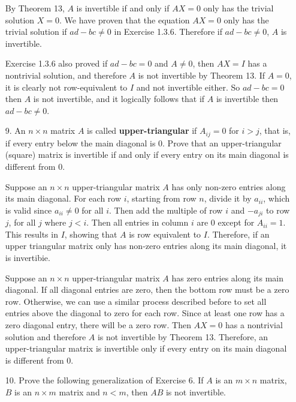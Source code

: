 \documentclass{article}
\begin{document}
\begin{enumerate}[listparindent=\parindent]
By Theorem 13, \(A\) is invertible if and only if \(AX = 0\) only has the trivial solution \(X = 0\).
We have proven that the equation \(AX = 0\) only has the trivial solution if \(ad - bc \neq 0\) in Exercise 1.3.6.
Therefore if \(ad - bc \neq 0\), \(A\) is invertible.

Exercise 1.3.6 also proved if \(ad - bc = 0\) and \(A \neq 0\), then \(AX = I\) has a nontrivial solution,
and therefore \(A\) is not invertible by Theorem 13. If \(A = 0\), it is clearly not row-equivalent to \(I\) and not invertible either.
So \(ad - bc = 0\) then \(A\) is not invertible, and it logically follows that if \(A\) is invertible then \(ad - bc \neq 0\).

\item[9.] An \(n \times n\) matrix \(A\) is called \textbf{upper-triangular} if \(A_{ij} = 0\) for \(i > j\),
    that is, if every entry below the main diagonal is 0. Prove that an upper-triangular (square) matrix
    is invertible if and only if every entry on its main diagonal is different from 0.

Suppose an \(n \times n\) upper-triangular matrix \(A\) has only non-zero entries along its main diagonal.
For each row \(i\), starting from row \(n\), divide it by \(a_{ii}\), which is valid since \(a_{ii} \neq 0\) for all \(i\).
Then add the multiple of row \(i\) and \(-a_{ji}\) to row \(j\), for all \(j\) where \(j < i\). Then all entries in column \(i\) are 0 except for \(A_{ii} = 1\).
This results in \(I\), showing that \(A\) is row equivalent to \(I\).
Therefore, if an upper triangular matrix only has non-zero entries along its main diagonal, it is invertibie.

Suppose an \(n \times n\) upper-triangular matrix \(A\) has zero entries along its main diagonal.
If all diagonal entries are zero, then the bottom row must be a zero row.
Otherwise, we can use a similar process described before to set all entries above the diagonal to zero for each row.
Since at least one row has a zero diagonal entry, there will be a zero row.
Then \(AX = 0\) has a nontrivial solution and therefore \(A\) is not invertible by Theorem 13.
Therefore, an upper-triangular matrix is invertible only if every entry on its main diagonal is different from 0.

\item[10.] Prove the following generalization of Exercise 6. If \(A\) is an \(m \times n\) matrix, \(B\) is an \(n \times m\) matrix
    and \(n < m\), then \(AB\) is not invertible.


\end{enumerate}
\end{document}

